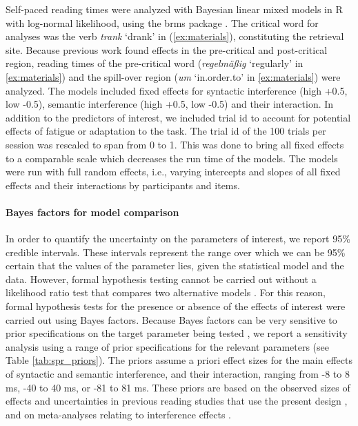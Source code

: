 \documentclass[review,preprint,12pt,authoryear,floatsintext]{elsarticle}
\begin{document}
\label{trim} Self-paced reading times were analyzed with Bayesian linear mixed models in R \citep{r} with log-normal likelihood, using the brms package \citep{brms}. The critical word for analyses was the verb \textit{trank} `drank' in (\ref{ex:materials}), constituting the retrieval site. Because previous work found effects in the pre-critical and post-critical region, reading times of the pre-critical word (\textit{regelmäßig} `regularly' in \ref{ex:materials}) and the spill-over region (\textit{um} `in.order.to' in \ref{ex:materials}) were analyzed. 
The models included fixed effects for syntactic interference (high +0.5, low -0.5), semantic interference (high +0.5, low -0.5) and their interaction. In addition to the predictors of interest, we included trial id to account for potential effects of fatigue or adaptation to the task. The trial id of the 100 trials per session was rescaled to span from 0 to 1. This was done to bring all fixed effects to a comparable scale which decreases the run time of the models. The models were run with full random effects, i.e., varying intercepts and slopes of all fixed effects and their interactions by participants and items.  

\paragraph{Bayes factors for model comparison}\label{BF_analysis_SPR}

In order to quantify the uncertainty on the parameters of interest, we report 95\% credible intervals. These intervals represent the range over which we can be 95\% certain that the values of the parameter lies, given the statistical model and the data. However, formal hypothesis testing cannot be carried out without a likelihood ratio test that compares two alternative models \citep{schad_etal_2022_BF,Royall}. For this reason, formal hypothesis tests for the presence or absence of the effects of interest were carried out using Bayes factors. Because Bayes factors can be very sensitive to prior specifications on the target parameter being tested \citep{schad_etal_2022_BF}, 
we report a sensitivity analysis using a range of prior specifications for the relevant parameters (see Table \ref{tab:spr_priors}). The priors assume a priori effect sizes for the main effects of syntactic and semantic interference, and their interaction, ranging from -8 to 8 ms, -40 to 40 ms, or -81 to 81 ms. These priors are based on the observed sizes of effects and uncertainties in previous reading studies that use the present design \citep{vandyke07,mertzen}, and on meta-analyses relating to interference effects \citep{jaeger_etal_2017}.
\end{document}
